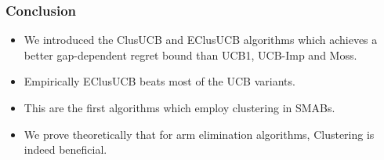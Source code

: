\begin{frame}
\frametitle{Conclusion}
\begin{itemize}
\item<1-> We introduced the ClusUCB and EClusUCB algorithms which achieves a better gap-dependent regret bound than UCB1, UCB-Imp and Moss.
\item<2-> Empirically EClusUCB beats most of the UCB variants.
\item<3-> This are the first algorithms which employ clustering in SMABs.
\item<4-> We prove theoretically that for arm elimination algorithms, Clustering is indeed beneficial.
\end{itemize}
\end{frame}